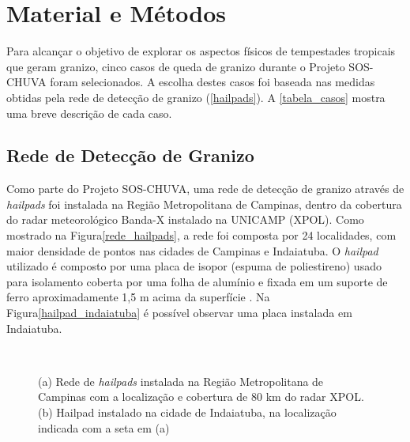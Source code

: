 \chapter{Material e Métodos}\label{database}

Para alcançar o objetivo de explorar os aspectos físicos de tempestades tropicais que geram granizo, cinco casos de queda de granizo durante o Projeto SOS-CHUVA foram selecionados. A escolha destes casos foi baseada nas medidas obtidas pela rede de detecção de granizo (\autoref{hailpads}). A \autoref{tabela_casos} mostra uma breve descrição de cada caso.



\section{Rede de Detecção de Granizo}\label{hailpads}

Como parte do Projeto SOS-CHUVA, uma rede de detecção de granizo através de \textit{hailpads} foi instalada na Região Metropolitana de Campinas, dentro da cobertura do radar meteorológico Banda-X instalado na UNICAMP (XPOL). Como mostrado na Figura\autoref{rede_hailpads}, a rede foi composta por 24 localidades, com maior densidade de pontos nas cidades de Campinas e Indaiatuba. O \textit{hailpad} utilizado é composto por uma placa de isopor (espuma de poliestireno) usado para isolamento coberta por uma folha de alumínio e fixada em um suporte de ferro aproximadamente 1,5 m acima da superfície \cite{ThomazJunior2016}. Na Figura\autoref{hailpad_indaiatuba} é possível observar uma placa instalada em Indaiatuba.

\begin{figure}[htb]
	\begin{center}
		\caption{(a) Rede de \textit{hailpads} instalada na Região Metropolitana de Campinas com a localização e cobertura de 80 km do radar XPOL. (b) Hailpad instalado na cidade de Indaiatuba, na localização indicada com a seta em (a)} 
		\label{overview_hailpads}
		\ \
		\\
	\end{center}
\end{figure}

